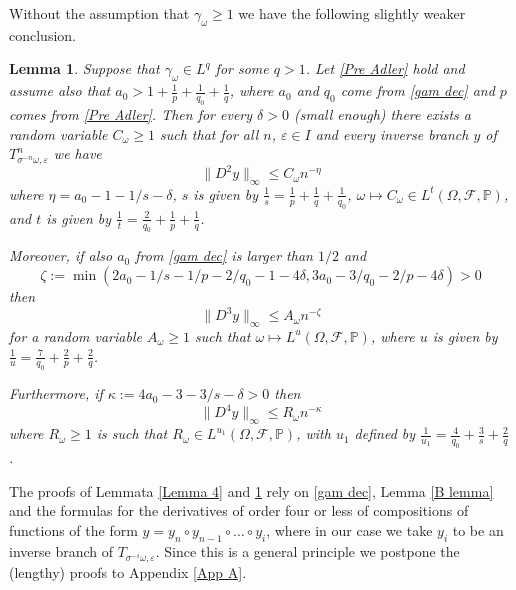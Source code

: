\documentclass[11pt,reqno,a4paper]{article}
\newtheorem{lemma}[theorem]{Lemma}
\theoremstyle{special}
\def\om{\omega}
\begin{document}
Without the assumption that $\gamma_\omega\geq1$ we have the following slightly weaker conclusion.
\begin{lemma}\label{Lemma 5} 
 Suppose  that $\gamma_\omega\in L^q$ for some $q>1$. Let  \eqref{Pre Adler} hold and assume also that $a_0>1+\frac{1}{p}+\frac{1}{q_0}+\frac1{q}$, where $a_0$ and $q_0$ come from \eqref{gam dec} and $p$ comes from \eqref{Pre Adler}.
Then for every $\delta>0$ (small enough) there exists a random variable $C_\omega\geq 1$ such that
for all $n$, $\varepsilon\in I$ and every inverse branch $y$ of $T_{\sigma^{-n}\omega,\varepsilon}^n$ we have 
$$
\|D^2y\|_\infty\leq C_\omega n^{-\eta}
$$
where $\eta=a_0-1-1/s-\delta$,
$s$ is given by $\frac{1}s=\frac{1}{p}+\frac{1}{q}+\frac{1}{q_0}$,  $\omega\mapsto C_\omega\in L^{t}(\Omega,\mathcal F,\mathbb P)$, and $t$ is given by $\frac{1}{t}=\frac{2}{q_0}+\frac{1}{p}+\frac{1}{q}$. 

Moreover, if also $a_0$ from \eqref{gam dec} is larger than $1/2$ and
$$
\zeta:=\min(2a_0-1/s-1/p-2/q_0-1-4\delta,3a_0-3/q_0-2/p-4\delta)>0
$$
then
$$
\|D^3y\|_\infty\leq A_\om n^{-\zeta}
$$
for a random variable $A_\om\geq 1$ such that $\om\mapsto L^u(\Omega, \mathcal F,\mathbb P)$, where $u$ is given by $\frac{1}u=\frac{7}{q_0}+\frac{2}{p}+\frac{2}{q}$.

Furthermore, if
$
\kappa:=4a_0-3-3/s-\delta>0
$
then
$$
\|D^4y\|_{\infty}\leq R_\om n^{-\kappa}
$$
where  $R_\om\geq 1$ is such that $R_\om\in L^{u_1}(\Omega,\mathcal F,\mathbb P)$, with $u_1$ defined by $\frac{1}{u_1}=\frac{4}{q_0}+\frac{3}{s}+\frac{2}{q}$. 
\end{lemma}


The proofs of Lemmata \ref{Lemma 4} and \ref{Lemma 5} rely on \eqref{gam dec}, Lemma \ref{B lemma} and the formulas for the derivatives of order four or less of compositions of functions of the form $y=y_n\circ y_{n-1}\circ \ldots \circ y_i$, where in our case we take $y_i$ to be an inverse branch of $T_{\sigma^{-i}\om,\varepsilon}$. Since this is a general  principle we postpone the (lengthy) proofs to Appendix \ref{App A}.
\end{document}
